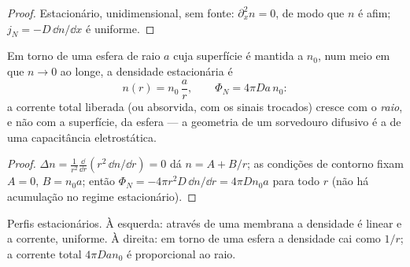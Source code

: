 \begin{proof}
Estacionário, unidimensional, sem fonte: $\partial_x^2 n = 0$, de modo que $n$ é
afim; $j_N = -D\,\dd n/\dd x$ é uniforme.
\end{proof}

\begin{proposition}\label{prop:b2:particle-diffusion:sphere}
Em torno de uma esfera de raio $a$ cuja superfície é mantida a $n_0$, num
meio em que $n \to 0$ ao longe, a densidade estacionária é
\[
n(r) = n_0\,\frac{a}{r}, \qquad
\Phi_N = 4\pi D a\,n_0 :
\]
a corrente total liberada (ou absorvida, com os sinais trocados) cresce
com o \emph{raio}, e não com a superfície, da esfera --- a
geometria de um sorvedouro difusivo é a de uma capacitância eletrostática.
\end{proposition}

\begin{proof}
$\Delta n = \frac{1}{r^2}\frac{\dd}{\dd r}(r^2\,\dd n/\dd r) = 0$ dá
$n = A + B/r$; as condições de contorno fixam $A = 0$, $B = n_0 a$; então
$\Phi_N = -4\pi r^2 D\,\dd n/\dd r = 4\pi D n_0 a$ para todo $r$ (não há
acumulação no regime estacionário).
\end{proof}

\begin{omfigure}

{\small Perfis estacionários. À esquerda: através de uma membrana a densidade é
linear e a corrente, uniforme. À direita: em torno de uma esfera a densidade
cai como $1/r$; a corrente total $4\pi D a n_0$ é proporcional ao
raio.}
\end{omfigure}


